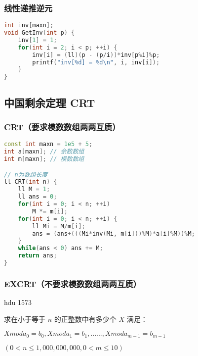 \subsubsection{线性递推逆元}

\begin{lstlisting}[language=C++]
int inv[maxn];
void GetInv(int p) {
    inv[1] = 1;
    for(int i = 2; i < p; ++i) {
        inv[i] = (ll)(p - (p/i))*inv[p%i]%p;
        printf("inv[%d] = %d\n", i, inv[i]);
    }
}
\end{lstlisting}

\subsection{中国剩余定理 CRT}

\subsubsection{CRT（要求模数数组两两互质）}

\begin{lstlisting}[language=C++]
const int maxn = 1e5 + 5;
int a[maxn]; // 余数数组
int m[maxn]; // 模数数组

// n为数组长度
ll CRT(int n) {
    ll M = 1;
    ll ans = 0;
    for(int i = 0; i < n; ++i)
        M *= m[i];
    for(int i = 0; i < n; ++i) {
        ll Mi = M/m[i];
        ans = (ans+(((Mi*inv(Mi, m[i]))%M)*a[i]%M))%M;
    }
    while(ans < 0) ans += M;
    return ans;
}
\end{lstlisting}

\subsubsection{EXCRT（不要求模数数组两两互质）}


hdu 1573

求在小于等于 $n$ 的正整数中有多少个 $X$ 满足：

$X mod a_0 = b_0, X mod a_1 = b_1, ...... , X mod a_{m - 1} = b_{m - 1}$

$(0 < n \le 1,000,000,000, 0 < m \le 10)$

